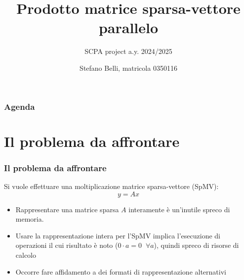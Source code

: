 \documentclass{beamer}
\title[Prodotto SpMV parallelo]
{Prodotto matrice sparsa-vettore parallelo}
\subtitle{SCPA project a.y. 2024/2025}
\author[Stefano Belli, 0350116]{Stefano Belli, matricola 0350116}
\institute[uniroma2]{Università degli Studi di Roma "Tor Vergata"}
\date{}
\newcommand{\dflvspace}{\vspace{10pt}}
\begin{document}
\begin{frame}
    \titlepage
\end{frame}

\begin{frame}
    \frametitle{Agenda}
    \tableofcontents
\end{frame}

\section{Il problema da affrontare}
\begin{frame}
    \frametitle{Il problema da affrontare}
    
    Si vuole effettuare una moltiplicazione matrice sparsa-vettore (SpMV):
    \begin{equation*}
    y = Ax
    \end{equation*}
    
    \dflvspace
    \dflvspace
    
    \begin{itemize}
    	\item Rappresentare una matrice sparsa $A$ interamente è un'inutile spreco di memoria.
    	
    	\item Usare la rappresentazione intera per l'SpMV implica l'esecuzione di operazioni il 
    	cui risultato è noto ($0 \cdot a = 0\;\;\forall a$), quindi spreco di risorse di calcolo
    
    	\item Occorre fare affidamento a dei formati di rappresentazione alternativi
    \end{itemize}
    
\end{frame}
\end{document}
